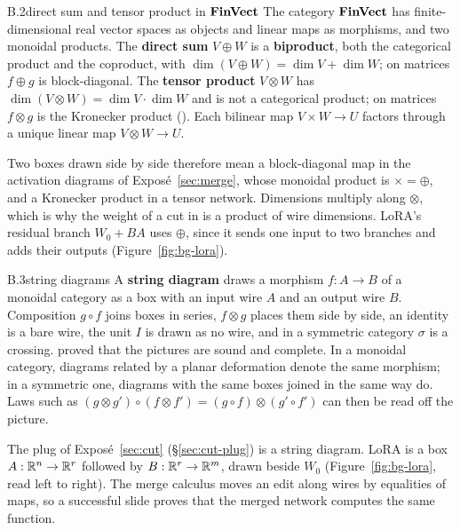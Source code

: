 \begin{bgentry}{B.2}{direct sum and tensor product in $\mathbf{FinVect}$}
The category $\mathbf{FinVect}$ has finite-dimensional real vector spaces as objects and linear maps as morphisms, and two
monoidal products.
The \textbf{direct sum} $V\oplus W$ is a \textbf{biproduct}, both the categorical product and the coproduct, with
$\dim(V\oplus W)=\dim V+\dim W$; on matrices $f\oplus g$ is block-diagonal. The \textbf{tensor product} $V\otimes W$ has
$\dim(V\otimes W)=\dim V\cdot\dim W$ and is not a categorical product; on matrices $f\otimes g$ is the Kronecker product
(). Each bilinear map $V\times W\to U$ factors through a unique linear map $V\otimes W\to U$.
\end{bgentry}

Two boxes drawn side by side therefore mean a block-diagonal map in the activation diagrams of Exposé~\ref{sec:merge},
whose monoidal product is $\times=\oplus$, and a Kronecker product in a tensor network. Dimensions multiply along
$\otimes$, which is why the weight of a cut in  is a product of wire dimensions. LoRA's residual
branch $W_0+BA$ uses $\oplus$, since it sends one input to two branches and adds their outputs
(Figure~\ref{fig:bg-lora}).


\begin{bgentry}{B.3}{string diagrams}
A \textbf{string diagram} draws a morphism $f:A\to B$ of a monoidal category as a box with an input wire $A$ and an
output wire $B$. Composition $g\circ f$ joins boxes in series, $f\otimes g$ places them side by side, an identity is a
bare wire, the unit $I$ is drawn as no wire, and in a symmetric category $\sigma$ is a crossing. \citet{xjoyal1991geometry}
proved that the pictures are sound and complete. In a monoidal category, diagrams related by a planar deformation denote
the same morphism; in a symmetric one, diagrams with the same boxes joined in the same way do. Laws such as
$(g\otimes g')\circ(f\otimes f')=(g\circ f)\otimes(g'\circ f')$ can then be read off the picture.
\end{bgentry}

The plug of Exposé~\ref{sec:cut} (\S\ref{sec:cut-plug}) is a string diagram. LoRA is a box $A:\mathbb{R}^n\to\mathbb{R}^r$ followed by
$B:\mathbb{R}^r\to\mathbb{R}^m$, drawn beside $W_0$ (Figure~\ref{fig:bg-lora}, read left to right). The merge calculus moves an edit
along wires by equalities of maps, so a successful slide proves that the merged network computes the same function.

